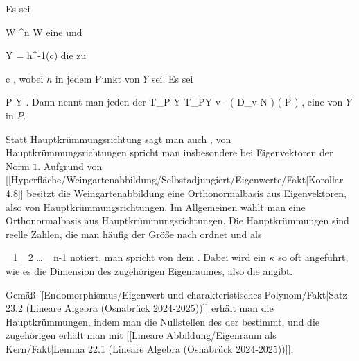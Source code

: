 {}
{

Es sei

\mavergleichskette
{\vergleichskette
{ W
}
{ \subseteq }{ \R^n
}
{  }{
}
{    }{
}
{   }{
}
}
{}{}{}
 { W } { \R
} {}
eine
und

\mavergleichskette
{\vergleichskette
{ Y
}
{ = }{ h^{-1}(c)
}
{  }{
}
{    }{
}
{   }{
}
}
{}{}{}
die
zu

\mavergleichskette
{\vergleichskette
{ c
}
{ \in }{ \R
}
{  }{
}
{    }{
}
{   }{
}
}
{}{}{,}
wobei $h$ in jedem Punkt von $Y$
sei. Es sei

\mavergleichskette
{\vergleichskette
{ P
}
{ \in }{ Y
}
{  }{
}
{    }{
}
{   }{
}
}
{}{}{.}
Dann nennt man jeden
der
 {T_P Y} { T_PY
} { v } { - \left(  D_{v}  N   \right) \left(   P  \right)
} {,}
eine
von $Y$ in $P$.

}

Statt Hauptkrümmungsrichtung sagt man auch  {,} von Hauptkrümmungsrichtungen spricht man insbesondere bei Eigenvektoren der Norm $1$. Aufgrund von
[[Hyperfläche/Weingartenabbildung/Selbstadjungiert/Eigenwerte/Fakt|Korollar 4.8]]
besitzt die Weingartenabbildung eine Orthonormalbasis aus Eigenvektoren, also von Hauptkrümmungsrichtungen. Im Allgemeinen wählt man eine Orthonormalbasis aus Hauptkrümmungsrichtungen. Die Hauptkrümmungen sind reelle Zahlen, die man häufig der Größe nach ordnet und als

\mavergleichskettedisp
{\vergleichskette
{ \kappa_1
}
{ \leq} { \kappa_2
}
{ \leq   \ldots \leq} { \kappa_{n-1}
}
{ } {
}
{ } {
}
}
{}{}{}
notiert, man spricht von dem  {.} Dabei wird ein $\kappa$ so oft angeführt, wie es die Dimension des zugehörigen Eigenraumes, also die
angibt.

Gemäß
[[Endomorphismus/Eigenwert und charakteristisches Polynom/Fakt|Satz 23.2 (Lineare Algebra (Osnabrück 2024-2025))]]
erhält man die Hauptkrümmungen, indem man die Nullstellen des
der
bestimmt, und die zugehörigen
erhält man mit
[[Lineare Abbildung/Eigenraum als Kern/Fakt|Lemma 22.1 (Lineare Algebra (Osnabrück 2024-2025))]].

